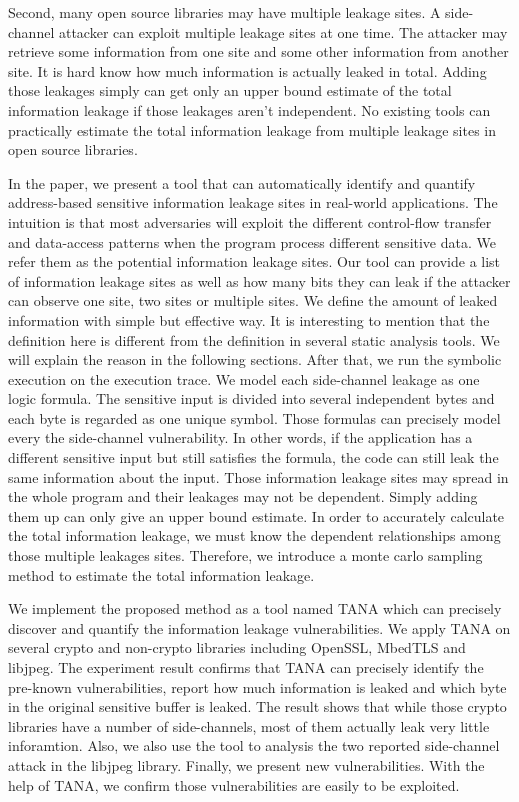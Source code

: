 Second, many open source libraries may have multiple leakage sites. 
A side-channel attacker\cite{191010,7163052} can exploit multiple leakage sites at one time. 
The attacker may retrieve some information from one site and some other information 
from another site.
It is hard know how much information is actually leaked in total. Adding those leakages 
simply can get only an upper bound estimate of the total information leakage if those 
leakages aren’t independent. No existing tools can practically estimate the total information 
leakage from multiple leakage sites in open source libraries.

In the paper, we present a tool that can automatically identify and quantify address-based
sensitive information leakage sites in real-world applications. The intuition is that most
adversaries will exploit the different control-flow transfer and data-access patterns when 
the program process different sensitive data. We refer them as the potential information
leakage sites. Our tool can provide a list of information leakage sites as well as how many 
bits they can leak if the attacker can observe one site, two sites or multiple sites. 
We define the amount of leaked information with simple but effective way. It is interesting to 
mention that the definition here is different from the definition in several static analysis 
tools. We will explain the reason in the following sections. After that, we run the symbolic 
execution on the execution trace. We model each side-channel leakage as one logic formula. 
The sensitive input is divided into several independent bytes and each byte is regarded as 
one unique symbol. Those formulas can precisely model every the side-channel vulnerability. 
In other words, if the application has a different sensitive input but still satisfies the formula, 
the code can still leak the same information about the input.  
Those information leakage sites may spread in the whole program 
and their leakages may not be dependent. Simply adding them up can only give an upper bound 
estimate. In order to accurately calculate the total information leakage, we must know the 
dependent relationships among those multiple leakages sites. Therefore, we introduce a 
monte carlo sampling method to estimate the total information leakage.

We implement the proposed method as a tool named TANA which can precisely discover and quantify the information
leakage vulnerabilities. We apply TANA on several crypto and non-crypto libraries including OpenSSL,
MbedTLS and libjpeg. The experiment result confirms that TANA can precisely identify the pre-known vulnerabilities,
report how much information is leaked and which byte in the original sensitive buffer is leaked. 
The result shows that while those crypto libraries have a number of side-channels, most of them actually
leak very little inforamtion. Also, we also use the tool to analysis the two reported side-channel attack 
in the libjpeg library. Finally, we present new vulnerabilities. With the help of TANA, we confirm those
vulnerabilities are easily to be exploited.

